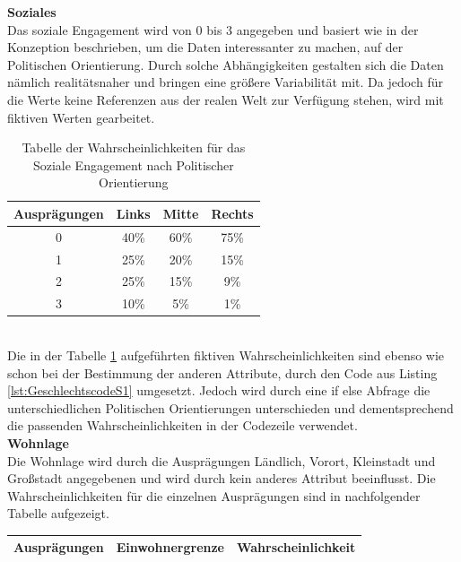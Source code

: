 \begin{onehalfspace}
\textbf{Soziales}\\
Das soziale Engagement wird von 0 bis 3 angegeben und basiert wie in der Konzeption beschrieben, um die Daten interessanter zu machen, auf der Politischen Orientierung. Durch solche Abhängigkeiten gestalten sich die Daten nämlich realitätsnaher und bringen eine größere Variabilität mit. Da jedoch für die Werte keine Referenzen aus der realen Welt zur Verfügung stehen, wird mit fiktiven Werten gearbeitet.\\
\begin{table}[!h]
    \centering
    \begin{tabular}{|c|c|c|c|}
    \hline
    \textbf{Ausprägungen} & \textbf{Links} & \textbf{Mitte} & \textbf{Rechts} \\ \hline
    0                     & 40\%           & 60\%           & 75\%            \\ \hline
    1                     & 25\%           & 20\%           & 15\%            \\ \hline
    2                     & 25\%           & 15\%           & 9\%             \\ \hline
    3                     & 10\%           & 5\%            & 1\%             \\ \hline
    \end{tabular}
    \caption{Tabelle der Wahrscheinlichkeiten für das Soziale Engagement nach Politischer Orientierung}
    \label{table:9}
\end{table}\\
Die in der Tabelle \ref{table:9} aufgeführten fiktiven Wahrscheinlichkeiten sind ebenso wie schon bei der Bestimmung der anderen Attribute, durch den Code aus Listing \ref{lst:GeschlechtscodeS1} umgesetzt. Jedoch wird durch eine if else Abfrage die unterschiedlichen Politischen Orientierungen unterschieden und dementsprechend die passenden Wahrscheinlichkeiten in der Codezeile verwendet.\\
\textbf{Wohnlage}\\
Die Wohnlage wird durch die Ausprägungen Ländlich, Vorort, Kleinstadt und Großstadt angegebenen und wird durch kein anderes Attribut beeinflusst. Die Wahrscheinlichkeiten für die einzelnen Ausprägungen sind in nachfolgender Tabelle aufgezeigt.
\begin{table}[!h]
    \centering
    \begin{tabular}{|c|c|c|}
    \hline
    \textbf{Ausprägungen} & \textbf{Einwohnergrenze} & \textbf{Wahrscheinlichkeit} \\ \hline

\end{tabular}
\end{table}
\end{onehalfspace}

